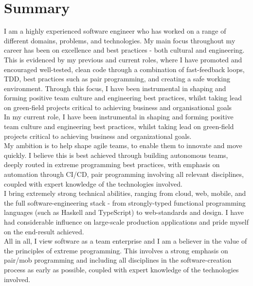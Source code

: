 \section{Summary}

I am a highly experienced software engineer who has worked on a range of different domains, problems, and technologies. My main focus throughout my career has been on excellence and best practices - both cultural and engineering.\\

This is evidenced by my previous and current roles, where I have promoted and encouraged well-tested, clean code through a combination of fast-feedback loops, TDD, best practices such as pair programming, and creating a safe working environment. Through this focus, I have been instrumental in shaping and forming positive team culture and engineering best practices, whilst taking lead on green-field projects critical to achieving business and organisational goals\\

In my current role, I have been instrumental in shaping and forming positive team culture and engineering best practices, whilst taking lead on green-field projects critical to achieving business and organizational goals.\\

My ambition is to help shape agile teams, to enable them to innovate and move quickly. I believe this is best achieved through building autonomous teams, deeply routed in extreme programming best practices, with emphasis on automation through CI/CD, pair programming involving all relevant disciplines, coupled with expert knowledge of the technologies involved.\\

I bring extremely strong technical abilities, ranging from cloud, web, mobile, and the full software-engineering stack - from strongly-typed functional programming languages (such as Haskell and TypeScript) to web-standards and design. I have had considerable influence on large-scale production applications and pride myself on the end-result achieved.\\

All in all, I view software as a team enterprise and I am a believer in the value of the principles of extreme programming. This involves a strong emphasis on pair/mob programming and including all disciplines in the software-creation process as early as possible, coupled with expert knowledge of the technologies involved.\\
